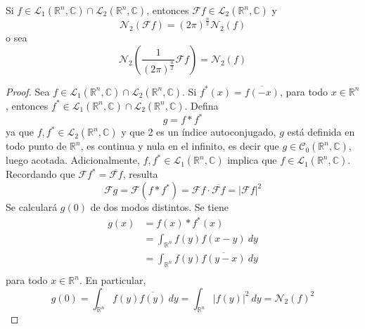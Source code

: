 \documentclass[12pt]{report}
\newcounter{it}
\theoremstyle{largebreak}
\newcommand\abs[1]{\ensuremath{\left|#1\right|}}
\newcommand\conj[1]{\ensuremath{\overline{#1}}}
\newcommand{\N}[2]{\ensuremath{\mathcal{N}_{#1}\left(#2\right)}}
\newcommand{\fou}[1]{\ensuremath{\mathcal{F}#1}}
\begin{document}
    \begin{propo}
        Si $f\in\mathcal{L}_1(\mathbb{R}^n,\mathbb{C})\cap\mathcal{L}_2(\mathbb{R}^n,\mathbb{C})$, entonces $\fou{f}\in\mathcal{L}_2(\mathbb{R}^n,\mathbb{C})$ y
        \begin{equation*}
            \N{2}{\fou{f}}=(2\pi)^{\frac{n}{2}}\N{2}{f}
        \end{equation*}
        o sea
        \begin{equation*}
            \N{2}{\frac{1}{(2\pi)^{\frac{n}{2}}}\fou{f}}=\N{2}{f}
        \end{equation*}
    \end{propo}

    \begin{proof}
        Sea $f\in\mathcal{L}_1(\mathbb{R}^n,\mathbb{C})\cap\mathcal{L}_2(\mathbb{R}^n,\mathbb{C})$. Si $f^*(x)=\conj{f(-x)}$, para todo $x\in\mathbb{R}^n$, entonces $f^*\in\mathcal{L}_1(\mathbb{R}^n,\mathbb{C})\cap\mathcal{L}_2(\mathbb{R}^n,\mathbb{C})$. Defina
        \begin{equation*}
            g=f*f^*
        \end{equation*}
        ya que $f,f^*\in\mathcal{L}_2(\mathbb{R}^n,\mathbb{C})$ y que 2 es un índice autoconjugado, $g$ está definida en todo punto de $\mathbb{R}^n$, es continua y nula en el infinito, es decir que $g\in\mathcal{C}_0(\mathbb{R}^n,\mathbb{C})$, luego acotada. Adicionalmente, $f,f^*\in\mathcal{L}_1(\mathbb{R}^n,\mathbb{C})$ implica que $f\in\mathcal{L}_1(\mathbb{R}^n,\mathbb{C})$. Recordando que $\fou{f^*}=\conj{\fou{f}}$, resulta
        \begin{equation*}
            \fou{g}=\fou{(f*f^*)}=\fou{f}\cdot\conj{\fou{f}}=\abs{\fou{f}}^2
        \end{equation*}
        Se calculará $g(0)$ de dos modos distintos. Se tiene
        \begin{equation*}
            \begin{split}
                g(x)&=f(x)*f^{*}(x)\\
                &=\int_{\mathbb{R}^n}f(y)f(x-y)\:dy\\
                &=\int_{\mathbb{R}^n}f(y)\conj{f(y-x)}\:dy\\
            \end{split}
        \end{equation*}
        para todo $x\in\mathbb{R}^n$. En particular,
        \begin{equation*}
            g(0)=\int_{\mathbb{R}^n}f(y)\conj{f(y)}\:dy=\int_{\mathbb{R}^n}\abs{f(y)}^2\:dy=\N{2}{f}^2

\end{equation*}
\end{proof}
\end{document}
